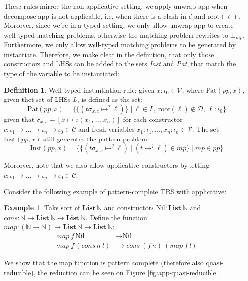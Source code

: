 \documentclass{report}
\theoremstyle{definition}
\newtheorem{definition_inner}{Definition}
\newenvironment{definition}
  {\begin{customblock}\begin{definition_inner}}
  {\end{definition_inner}\end{customblock}}
\newtheorem{example_inner}{Example}
\newenvironment{example}
  {\begin{customblock}\begin{example_inner}}
  {\end{example_inner}\end{customblock}}
\begin{document}
These rules mirror the non-applicative setting, we apply unwrap-app when decompose-app is not applicable, i.e. when there is a clash in $d$ and $\text{root}(\ell)$. Moreover, since we're in a typed setting, we only allow unwrap-app to create well-typed matching problems, otherwise the matching problem rewrites to $\bot_{mp}$. Furthermore, we only allow well-typed matching problems to be generated by instantiate. Therefore, we make clear in the definition, that only those constructors and LHSs can be added to the sets \textit{Inst} and \textit{Pat}, that match the type of the variable to be instantiated:

\begin{definition}\label{def:app-instantiate}
Well-typed instantiation rule: given $x : \iota_0 \in \mathcal{V}$, where $\text{Pat}(pp, x)$, given thet set of LHSs $L$, is defined as the set:
$$\text{Pat}(pp, x) = \{ \{(t\sigma_{x,c}\mapsto^? \ell)\} \mid \ell \in L,\ \text{root}(\ell) \not\in \mathcal{D},\ \ell : \iota_0\}$$
given that $\sigma_{x,c} = [x \mapsto c(x_1, \dots, x_n)]$ for each constructor $c : \iota_1 \to \dots \to \iota_n \to \iota_0 \in \mathcal{C}$ and fresh variables $x_1 : \iota_1, \dots, x_n : \iota_n \in \mathcal{V}$.
The set $\text{Inst}(pp, x)$ still generates the pattern problem:
$$\text{Inst}(pp, x) = \{ \{ (t\sigma_{x,c}\mapsto^? \ell) \mid (t\mapsto^? \ell) \in mp \} \mid mp \in pp\}$$
\end{definition}

Moreover, note that we also allow applicative constructors by letting $c : \iota_1 \to \dots \to \iota_n \to \iota_0 \in \mathcal{C}$.

Consider the following example of pattern-complete TRS with applicative:
\begin{example}\label{ex:app-quasi-reducible}
    Take sort of $\mathbf{List}\ \mathbb{N}$ and constructors $\text{Nil} : \mathbf{List}\ \mathbb{N}$ and $cons : \mathbb{N} \to \mathbf{List}\  \mathbb{N} \to \mathbf{List}\  \mathbb{N}$. Define the function $map : (\mathbb{N} \to \mathbb{N}) \to \mathbf{List}\ \mathbb{N} \to \mathbf{List}\ \mathbb{N}$:
    \begin{align*}
        map\ f\ \text{Nil} &\to \text{Nil} \\
        map\ f\ (cons\ n\ l) &\to cons\ (f\ n)\ (map\ f\ l)
    \end{align*}
\end{example}
We show that the map function is pattern complete (therefore also quasi-reducible), the reduction can be seen on Figure \ref{fig:app-quasi-reducible}.
\end{document}
